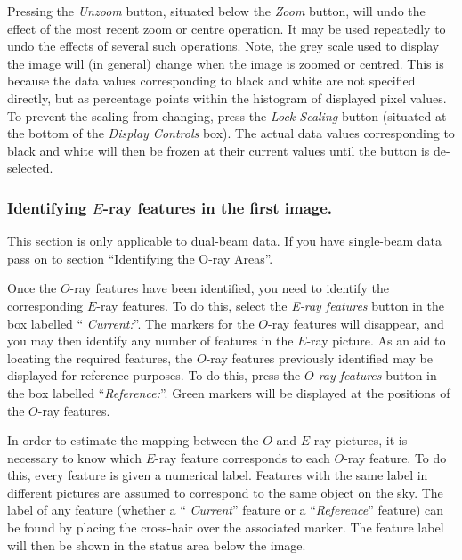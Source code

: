 \documentclass[11pt]{article}
\newcommand{\htmlref}[2]{#1}
\begin{document}
Pressing the \htmlref{\emph{Unzoom}}{POLKA_UNZOOM} button, situated below
the \htmlref{\emph{Zoom}}{POLKA_ZOOM} button, will undo the effect of the
most recent zoom or centre operation. It may be used repeatedly to undo
the effects of several such operations. Note, the grey scale used to
display the image will (in general) change when the image is zoomed or
centred. This is because the data values corresponding to black and
white are not specified directly, but as percentage points within the
histogram of displayed pixel values. To prevent the scaling from
changing, press the \htmlref{\emph{Lock Scaling}}{POLKA_LOCK_SCALING}
button (situated at the bottom of the \htmlref{\emph{Display Controls}}
{POLKA_DISPLAY_CONTROLS} box). The actual data values corresponding to
black and white will then be frozen at their current values until the
button is de-selected.

\subsubsection {Identifying $E$-ray features in the first image.}
This section is only applicable to dual-beam data. If you have
single-beam data pass on to section ``\htmlref{Identifying the O-ray Areas}
{TUT_O_RAY_AREAS}''.

Once the $O$-ray features have been identified, you need to identify the
corresponding $E$-ray features. To do this, select the \emph{E-ray
features} button in the box labelled ``\htmlref{{\em
Current:}}{POLKA_CURRENT}''. The markers for the $O$-ray features will
disappear, and you may then identify any number of features in the
$E$-ray picture. As an aid to locating the required features, the $O$-ray
features previously identified may be displayed for reference purposes. To
do this, press the \emph{$O$-ray features} button in the box labelled
``\htmlref{\emph{Reference:}}{POLKA_REFERENCE}''. Green markers will be
displayed at the positions of the $O$-ray features.

In order to estimate the mapping between the $O$ and $E$ ray pictures, it
is necessary to know which $E$-ray feature corresponds to each $O$-ray
feature. To do this, every feature is given a numerical label. Features
with the same label in different pictures are assumed to correspond to
the same object on the sky. The label of any feature (whether a ``{\em
Current}'' feature or a ``\emph{Reference}'' feature) can be found by
placing the cross-hair over the associated marker. The feature label
will then be shown in the \htmlref{status area}{POLKA_STATUS_AREA} below
the image.
\end{document}
